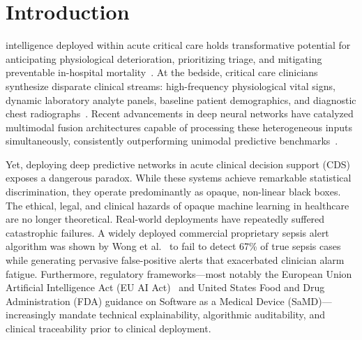 \documentclass[10pt,journal,compsoc,twocolumn]{IEEEtran}
\begin{document}
\maketitle
\IEEEdisplaynontitleabstractindextext
\IEEEpeerreviewmaketitle

\section{Introduction}
 intelligence deployed within acute critical care holds transformative potential for anticipating physiological deterioration, prioritizing triage, and mitigating preventable in-hospital mortality~\cite{haug2023artificial}. At the bedside, critical care clinicians synthesize disparate clinical streams: high-frequency physiological vital signs, dynamic laboratory analyte panels, baseline patient demographics, and diagnostic chest radiographs~\cite{huang2020fusion,chen2022pan}. Recent advancements in deep neural networks have catalyzed multimodal fusion architectures capable of processing these heterogeneous inputs simultaneously, consistently outperforming unimodal predictive benchmarks~\cite{huang2020fusion}.

Yet, deploying deep predictive networks in acute clinical decision support (CDS) exposes a dangerous paradox. While these systems achieve remarkable statistical discrimination, they operate predominantly as opaque, non-linear black boxes. The ethical, legal, and clinical hazards of opaque machine learning in healthcare are no longer theoretical. Real-world deployments have repeatedly suffered catastrophic failures. A widely deployed commercial proprietary sepsis alert algorithm was shown by Wong et al.~\cite{wong2021external} to fail to detect 67\% of true sepsis cases while generating pervasive false-positive alerts that exacerbated clinician alarm fatigue. Furthermore, regulatory frameworks---most notably the European Union Artificial Intelligence Act (EU AI Act)~\cite{eu_ai_act2024} and United States Food and Drug Administration (FDA) guidance on Software as a Medical Device (SaMD)---increasingly mandate technical explainability, algorithmic auditability, and clinical traceability prior to clinical deployment.
\end{document}
